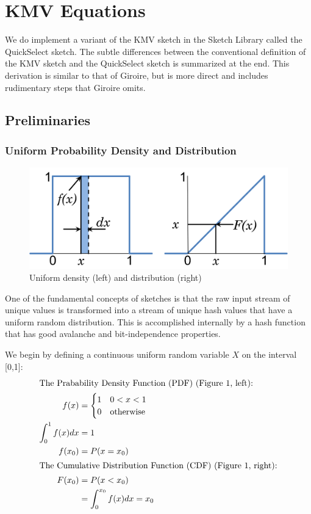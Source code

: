 %
\section{KMV Equations}
We do implement a variant of the KMV sketch in the Sketch Library called the QuickSelect sketch. The subtle differences between the conventional definition of the KMV sketch and the QuickSelect sketch is summarized at the end. This derivation is similar to that of Giroire\cite{Giroire2009}, but is more direct and includes rudimentary steps that Giroire omits.
%
\subsection{Preliminaries}
\subsubsection{Uniform Probability Density and Distribution}
%
\begin{figure}
\begin{center}
\includegraphics[width=0.5\linewidth]{figures/UniformDenCum.png}
\end{center}
\caption{Uniform density (left) and distribution (right)}
\end{figure}
%
One of the fundamental concepts of sketches is that the raw input stream of 
unique values is transformed into a stream of unique hash values that have 
a uniform random distribution. 
This is accomplished internally by a hash function that has good avalanche 
and bit-independence properties.  

We begin by defining a continuous uniform random variable $X$ on the interval
[0,1]:
\begin{align}
\shortintertext{The Prabability Density Function (PDF) (Figure 1, left):}
f(x)            &= \begin{cases}
                     1  & 0<x<1   \\
                     0  & \text{otherwise} 
                   \end{cases}  \label{density} \\
\int_0^1 f(x)dx &= 1 \notag \\
f(x_0)          &= P(x = x_0) \notag \\
\shortintertext{The Cumulative Distribution Function (CDF) (Figure 1, right):}
F(x_0)          &= P(x<x_0) \notag \\
                &= \int_0^{x_0} f(x)dx=x_0 \label{distribution}
\end{align}

